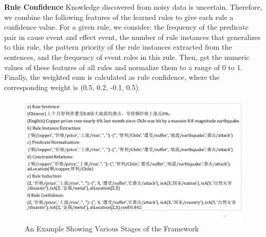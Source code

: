 \noindent
\textbf{Rule Confidence}
Knowledge discovered from noisy data is uncertain. Therefore, we combine the following features of the learned rules to give each rule a confidence value. For a given rule, we consider:
the frequency of the predicate pair in cause event and effect event,
the number of rule instances that generalizes to this rule,
the pattern priority of the rule instances extracted from the sentences,
and the frequency of event roles in this rule.
Then, get the numeric values of these features of all rules and normalize them to a range of 0 to 1. Finally, the weighted sum is calculated as rule confidence, where the corresponding weight is (0.5, 0.2, -0.1, 0.5).
\begin{figure}[htbp]
	\centering
	\includegraphics[width=0.95\columnwidth]{figures/example}
	\caption{An Example Showing Various Stages of the Framework}
	\label{fig:stages_in_an_example}
\end{figure}

